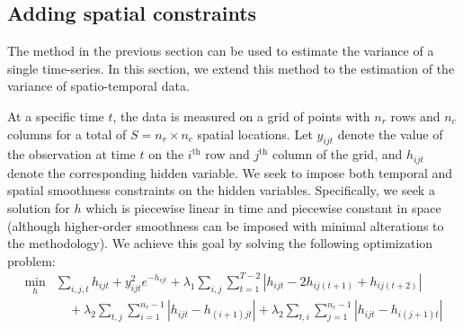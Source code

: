 \documentclass{article}
\begin{document}
\subsection{Adding spatial constraints}
\label{sec:exten}

The method in the previous section can be used to estimate the
variance of a single time-series. In this section, we extend this
method to the estimation of the variance of spatio-temporal data. 

At a specific time $t$, the data is measured on a grid of points with
$n_r$ rows and $n_c$ columns for a total of $S=n_r\times n_c$ spatial
locations. Let $y_{ijt}$ denote the value of the 
observation at time $t$ on the $i^\text{th}$ row and $j^\text{th}$
column of the grid, and $h_{ijt}$ denote the corresponding hidden
variable. We seek to impose both temporal and spatial smoothness
constraints on the hidden variables. Specifically, we seek a solution
for $h$ which is piecewise linear in time and piecewise constant in
space (although higher-order smoothness can be imposed with minimal
alterations to the methodology). We achieve this goal
by solving the following optimization problem: 
\begin{align}
\min_h &\sum_{i,j,t}h_{ijt}+y_{ijt}^2e^{-h_{ijt}}
+\lambda_1 \sum_{i,j} \sum_{t=1}^{T-2} \left|h_{ijt}-2h_{ij(t+1)}+h_{ij(t+2)}\right|\\
&\quad+\lambda_2 \sum_{t,j} \sum_{i=1}^{n_r-1} \left|h_{ijt}-h_{(i+1)jt}\right|
+\lambda_2 \sum_{t,i} \sum_{j=1}^{n_c-1} \left|h_{ijt}-h_{i(j+1)t}\right|
\label{eq:l1tf_var_st}
\end{align}
\end{document}
